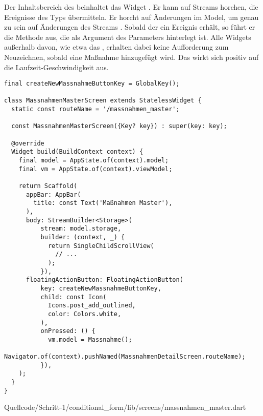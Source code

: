 Der Inhaltsbereich des  beinhaltet das Widget  .
Er kann auf Streams horchen, die Ereignisse des Typs  übermitteln.
Er horcht auf Änderungen im Model, um genau zu sein auf Änderungen des Streams  . Sobald der  ein Ereignis erhält, so führt er die Methode aus, die als Argument des Parameters  hinterlegt ist. Alle Widgets außerhalb davon, wie etwa das , erhalten dabei keine Aufforderung zum Neuzeichnen, sobald eine Maßnahme hinzugefügt wird. Das wirkt sich positiv auf die Laufzeit-Geschwindigkeit aus.


\ifIncludeFigures
  \begin{listing}[htbp]
    \renewcommand\theFancyVerbLine{%
      \ifnum\value{FancyVerbLine}=31
      \setcounter{FancyVerbLine}{85}
      \tiny\ldots
      \else
      \tiny\arabic{FancyVerbLine}%
      \fi
    }
    \begin{verbatim}
final createNewMassnahmeButtonKey = GlobalKey();

class MassnahmenMasterScreen extends StatelessWidget {
  static const routeName = '/massnahmen_master';

  const MassnahmenMasterScreen({Key? key}) : super(key: key);

  @override
  Widget build(BuildContext context) {
    final model = AppState.of(context).model;
    final vm = AppState.of(context).viewModel;

    return Scaffold(
      appBar: AppBar(
        title: const Text('Maßnahmen Master'),
      ),
      body: StreamBuilder<Storage>(
          stream: model.storage,
          builder: (context, _) {
            return SingleChildScrollView(
              // ...
            );
          }),
      floatingActionButton: FloatingActionButton(
          key: createNewMassnahmeButtonKey,
          child: const Icon(
            Icons.post_add_outlined,
            color: Colors.white,
          ),
          onPressed: () {
            vm.model = Massnahme();
            Navigator.of(context).pushNamed(MassnahmenDetailScreen.routeName);
          }),
    );
  }
}
\end{verbatim}
     {Quellcode/Schritt-1/conditional_form/lib/screens/massnahmen_master.dart}
    \label{lst:Schritt1KlasseMassnahmenMasterScreenStruktur}
  \end{listing}
\fi

\ifIncludeFigures \clearpage \fi
